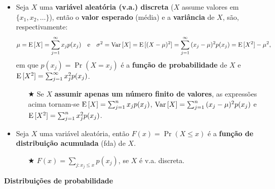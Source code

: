 \documentclass[10pt]{article}%
\def\Var{{\rm Var}\,}
\def\E{{\rm E}\,}
\begin{document}
\begin{itemize}%
\item Seja $X$ uma {\bf variável aleatória (v.a.) discreta} ($X$ assume valores em $\{x_1,x_2,\ldots\}$), então o {\bf valor esperado} (média) e a {\bf variância} de $X$, são, respectivamente:
$$
\mu = \E[X] = \sum_{j=1}^{\infty}{x_j p(x_j)}\quad\mbox{e}\quad \sigma^2 = \Var[X] = \E[(X - \mu)^2] = \sum_{j=1}^{\infty}{(x_j - \mu)^2 p(x_j)} = \E[X^2] - \mu^2,
$$
em que $p(x_j) = \Pr(X = x_j)$ é a {\bf função de probabilidade} de $X$ e $\E[X^2] = \sum_{j=1}^{\infty}{x_j^2 p(x_j)}$.
\begin{itemize}
\item[$\bigstar$] Se $X$ {\bf assumir apenas um número finito de valores}, as expressões acima tornam-se $\E[X] = \sum_{j=1}^{n}{x_j p(x_j)}$, $\Var[X] = \sum_{j=1}^{n}{(x_j - \mu)^2 p(x_j)}$ e $\E[X^2] = \sum_{j=1}^{n}{x_j^2 p(x_j)}$.
\end{itemize}
\item Seja $X$ uma variável aleatória, então $F(x) = \Pr(X\leq x)$ é a {\bf função de distribuição acumulada} (fda) de $X$.
\begin{itemize}
\item[$\bigstar$] $\displaystyle{F(x) = \sum_{j:x_j\leq x}{p(x_j)}}$, se $X$ é v.a. discreta.
\end{itemize}
\end{itemize}

\textbf{Distribuições de probabilidade}
\end{document}
